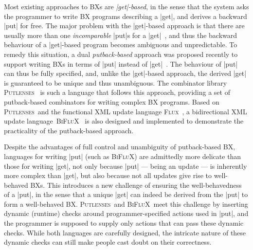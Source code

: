 \documentclass[fleqn]{llncs}
\renewcommand{\emph}{\textsl}
\newcommand{\Putlenses}{\textsc{Putlenses}}
\newcommand{\BiFluX}{\textsc{BiFluX}}
\begin{document}
Most existing approaches to BXs are \emph{|get|-based}, in the sense that the system asks the programmer to write BX programs describing a |get|, %
and derives a backward |put| for free.
The major problem with the |get|-based approach is that there are usually more than one \emph{incomparable} |put|s for a |get|~\cite{BuCV08}, and thus the backward behaviour of a |get|-based program becomes ambiguous and unpredictable.
%
To remedy this situation, a dual \emph{putback-based} approach was proposed recently to support writing BXs in terms of |put| instead of |get|~\cite{Fischer-essence-of-BX}.
The behaviour of |put| can thus be fully specified, and, unlike the |get|-based approach, the derived |get| is guaranteed to be unique and thus unambiguous.
The combinator library \Putlenses~\cite{Pacheco-putlenses} is such a language that follows this approach, providing a set of putback-based combinators for writing complex BX programs.
Based on \Putlenses\ and the functional XML update language \textsc{Flux}~\cite{Cheney-FLUX}, a bidirectional XML update language~\BiFluX~\cite{Pacheco-BiFluX} is also designed and implemented to demonstrate the practicality of the putback-based approach.

Despite the advantages of full control and unambiguity of putback-based BX, languages for writing |put| (such as \BiFluX)
are admittedly more delicate than those for writing |get|, not only because |put| --- being an update --- is inherently more complex than |get|, but also because not all updates give rise to well-behaved BXs.
This introduces a new challenge of ensuring the well-behavedness of a |put|, in the sense that a unique |get| can indeed be derived from the |put| to form a well-behaved BX.
\Putlenses\ and \BiFluX\ meet this challenge by inserting dynamic (runtime) checks around programmer-specified actions used in |put|, and the programmer is supposed to supply only actions that can pass these dynamic checks.
While both languages are carefully designed, the intricate nature of these dynamic checks can still make people cast doubt on their correctness.
\end{document}
